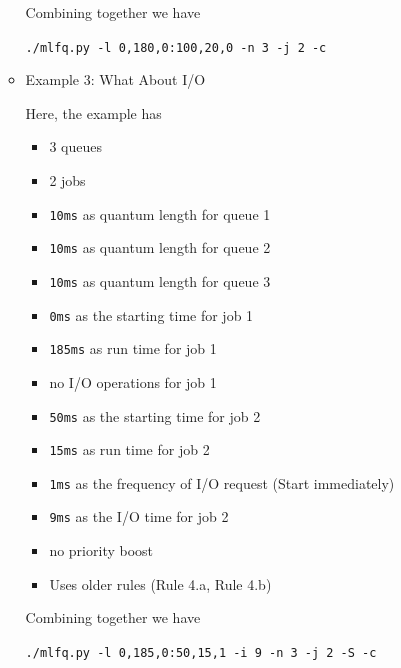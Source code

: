 \documentclass[12pt]{article}
\begin{document}
\begin{enumerate}[1.]
\begin{itemize}
        \bigskip

        Combining together we have

        \bigskip

        \texttt{./mlfq.py -l 0,180,0:100,20,0 -n 3 -j 2 -c}

        \bigskip

        \item Example 3: What About I/O

        \bigskip

        Here, the example has

        \begin{itemize}
            \item 3 queues
            \item 2 jobs
            \item \texttt{10ms} as quantum length for queue 1
            \item \texttt{10ms} as quantum length for queue 2
            \item \texttt{10ms} as quantum length for queue 3
            \item \texttt{0ms} as the starting time for job 1
            \item \texttt{185ms} as run time for job 1
            \item no I/O operations for job 1
            \item \texttt{50ms} as the starting time for job 2
            \item \texttt{15ms} as run time for job 2
            \item \texttt{1ms} as the frequency of I/O request (Start immediately)
            \item \texttt{9ms} as the I/O time for job 2
            \item no priority boost
            \item Uses older rules (Rule 4.a, Rule 4.b)
        \end{itemize}

        \bigskip

        Combining together we have

        \bigskip

        \texttt{./mlfq.py -l 0,185,0:50,15,1 -i 9 -n 3 -j 2 -S -c}

        \bigskip
    \end{itemize}


\end{enumerate}
\end{document}
